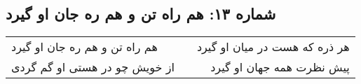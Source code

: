 \begin{center}
\section*{شماره ۱۳: هم راه تن و هم ره جان او گیرد}
\label{sec:013}
\begin{longtable}{l p{0.5cm} r}
هم راه تن و هم ره جان او گیرد
&&
هر ذره که هست در میان او گیرد
\\
از خویش چو در هستی او گم گردی
&&
پیش نظرت همه جهان او گیرد
\\
\end{longtable}
\end{center}
